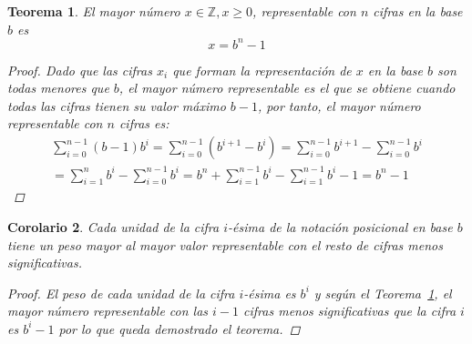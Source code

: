 \documentclass[spanish,a4paper,12pt,titlepage]{article}
\newtheorem{theorem}{Teorema}%
\newtheorem{corollary}[theorem]{Corolario}
\theoremstyle{definition}
\theoremstyle{remark}
\newcommand{\bbZ}{\mathbb{Z}}
\begin{document}
\begin{theorem}\label{theorem-maxn}
  El mayor número $x \in \bbZ, x \ge 0$, representable con $n$ cifras en la
  base $b$ es
  \[
    x = b^n - 1
  \]

  \begin{proof}
    Dado que las cifras $x_i$ que forman la representación de $x$ en la
    base $b$ son todas menores que $b$, el mayor número representable es el
    que se obtiene cuando todas las cifras tienen su valor máximo $b-1$, por
    tanto, el mayor número representable con $n$ cifras es:
    \begin{align*}
      \sum_{i=0}^{n-1} (b-1)b^i
      = \sum_{i=0}^{n-1} \left(b^{i+1}-b^i\right)
      = \sum_{i=0}^{n-1} b^{i+1} - \sum_{i=0}^{n-1} b^i\\
      = \sum_{i=1}^{n} b^{i} - \sum_{i=0}^{n-1} b^i
      = b^n + \sum_{i=1}^{n-1} b^{i} - \sum_{i=1}^{n-1} b^i - 1
      = b^n - 1
    \end{align*}
  \end{proof}
\end{theorem}

\begin{corollary}\label{corollary-pos-digit}
  Cada unidad de la cifra $i$-ésima de la notación posicional en base $b$
  tiene un peso mayor al mayor valor representable con el resto de cifras
  menos significativas.
  \begin{proof}
    El peso de cada unidad de la cifra $i$-ésima es $b^i$ y según
    el Teorema~\ref{theorem-maxn}, el mayor número representable con las
    $i-1$ cifras menos significativas que la cifra $i$ es $b^i-1$ por lo
    que queda demostrado el teorema.
  \end{proof}
\end{corollary}
\end{document}
